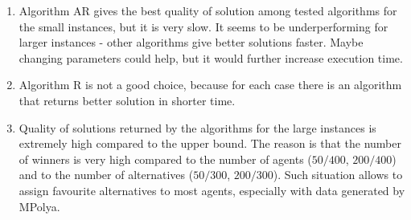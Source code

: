 \begin{enumerate}
	\item Algorithm AR gives the best quality of solution among tested algorithms for the small instances, but it is very slow. It seems to be underperforming for larger instances - other algorithms give better solutions faster. Maybe changing parameters could help, but it would further increase execution time.
    \item Algorithm R is not a good choice, because for each case there is an algorithm that returns better solution in shorter time.
	\item Quality of solutions returned by the algorithms for the large instances is extremely high compared to the upper bound. The reason is that the number of winners is very high compared to the number of agents ($50/400$, $200/400$) and to the number of alternatives ($50/300$, $200/300$). Such situation allows to assign favourite alternatives to most agents, especially with data generated by MPolya.
\end{enumerate}